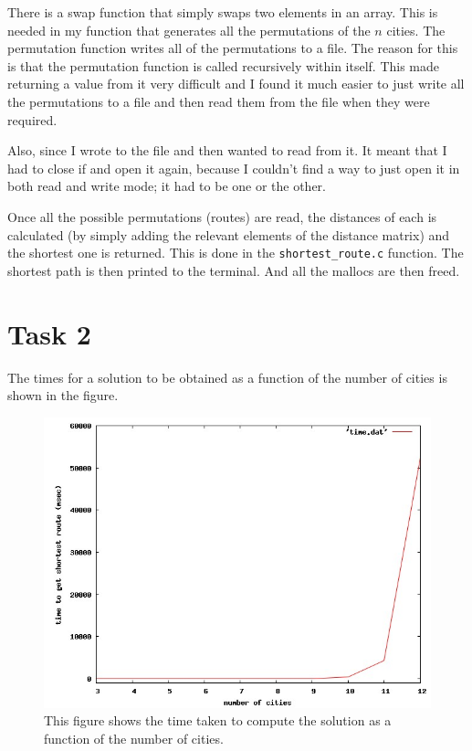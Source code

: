 \documentclass{article}
\begin{document}
There is a swap function that simply swaps two elements in an array. This is needed in my function that generates all the permutations of the $n$ cities. The permutation function writes all of the permutations to a file. The reason for this is that the permutation function is called recursively within itself. This made returning a value from it very difficult and I found it much easier to just write all the permutations to a file and then read them from the file when they were required.

Also, since I wrote to the file and then wanted to read from it. It meant that I had to close if and open it again, because I couldn't find a way to just open it in both read and write mode; it had to be one or the other.

Once all the possible permutations (routes) are read, the distances of each is calculated (by simply adding the relevant elements of the distance matrix) and the shortest one is returned. This is done in the \verb!shortest_route.c! function. The shortest path is then printed to the terminal. And all the mallocs are then freed.

\section{Task 2}

The times for a solution to be obtained as a function of the number of cities is shown in the figure.

\begin{figure}
\includegraphics[scale=0.5]{../task2/plot.jpg}
\caption{This figure shows the time taken to compute the solution as a function of the number of cities.}
\end{figure}
\end{document}
